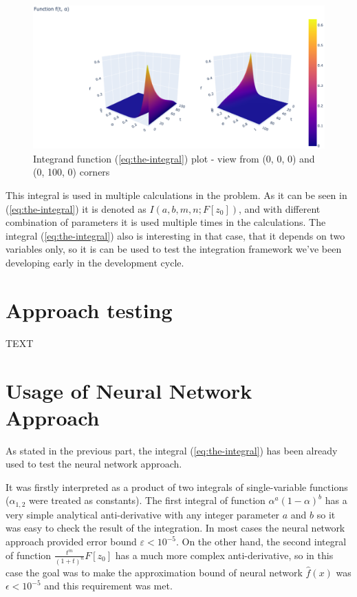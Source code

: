 \documentclass[%
]{ittmm}
\begin{document}
\begin{figure}
    \centering
    \includegraphics[width=0.8\linewidth]{f(t,a)33.png}
    \caption{Integrand function (\ref{eq:the-integral}) plot - view from (0, 0, 0) and (0, 100, 0) corners}
    \label{fig:integrand-plot}
\end{figure}

\noindent This integral is used in multiple calculations in the problem. As it can be seen in (\ref{eq:the-integral}) it is denoted as $I(a, b, m, n; F[z_{0}])$, and with different combination of parameters it is used multiple times in the calculations. The integral (\ref{eq:the-integral}) also is interesting in that case, that it depends on two variables only, so it is can be used to test the integration framework we've been developing early in the development cycle. 

\section{Approach testing}

TEXT

\section{Usage of Neural Network Approach}

As stated in the previous part, the integral (\ref{eq:the-integral}) has been already used to test the neural network approach. 

It was firstly interpreted as a product of two integrals of single-variable functions ($\alpha_{1,2}$ were treated as constants). The first integral of function $\alpha^{a}(1 - \alpha)^b$ has a very simple analytical anti-derivative with any integer parameter $a$ and $b$ so it was easy to check the result of the integration. In most cases the neural network approach provided error bound $\varepsilon < 10^{-5}$. On the other hand, the second integral of function $\frac{t^m}{(1+t)^n}F[z_{0}]$ has a much more complex anti-derivative, so in this case the goal was to make the approximation bound of neural network $\hat{f}(x)$ was $\epsilon < 10^{-5}$ and this requirement was met.
\end{document}
